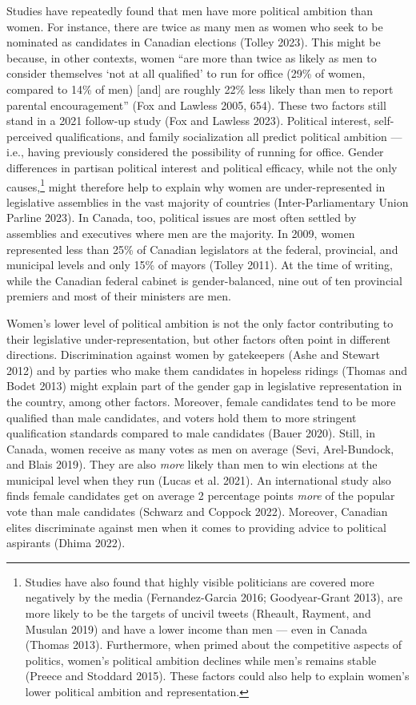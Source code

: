 \documentclass[
  letterpaper,
  DIV=11,
  numbers=noendperiod]{scrreprt}
\begin{document}
Studies have repeatedly found that men have more political ambition than
women. For instance, there are twice as many men as women who seek to be
nominated as candidates in Canadian elections (Tolley 2023). This might
be because, in other contexts, women ``are more than twice as likely as
men to consider themselves `not at all qualified' to run for office
(29\% of women, compared to 14\% of men) {[}and{]} are roughly 22\% less
likely than men to report parental encouragement'' (Fox and Lawless
2005, 654). These two factors still stand in a 2021 follow-up study (Fox
and Lawless 2023). Political interest, self-perceived qualifications,
and family socialization all predict political ambition --- i.e., having
previously considered the possibility of running for office. Gender
differences in partisan political interest and political efficacy, while
not the only causes,\footnote{Studies have also found that highly
  visible politicians are covered more negatively by the media
  (Fernandez-Garcia 2016; Goodyear-Grant 2013), are more likely to be
  the targets of uncivil tweets (Rheault, Rayment, and Musulan 2019) and
  have a lower income than men --- even in Canada (Thomas 2013).
  Furthermore, when primed about the competitive aspects of politics,
  women's political ambition declines while men's remains stable (Preece
  and Stoddard 2015). These factors could also help to explain women's
  lower political ambition and representation.} might therefore help to
explain why women are under-represented in legislative assemblies in the
vast majority of countries (Inter-Parliamentary Union Parline 2023). In
Canada, too, political issues are most often settled by assemblies and
executives where men are the majority. In 2009, women represented less
than 25\% of Canadian legislators at the federal, provincial, and
municipal levels and only 15\% of mayors (Tolley 2011). At the time of
writing, while the Canadian federal cabinet is gender-balanced, nine out
of ten provincial premiers and most of their ministers are men.

Women's lower level of political ambition is not the only factor
contributing to their legislative under-representation, but other
factors often point in different directions. Discrimination against
women by gatekeepers (Ashe and Stewart 2012) and by parties who make
them candidates in hopeless ridings (Thomas and Bodet 2013) might
explain part of the gender gap in legislative representation in the
country, among other factors. Moreover, female candidates tend to be
more qualified than male candidates, and voters hold them to more
stringent qualification standards compared to male candidates (Bauer
2020). Still, in Canada, women receive as many votes as men on average
(Sevi, Arel-Bundock, and Blais 2019). They are also \emph{more} likely
than men to win elections at the municipal level when they run (Lucas et
al. 2021). An international study also finds female candidates get on
average 2 percentage points \emph{more} of the popular vote than male
candidates (Schwarz and Coppock 2022). Moreover, Canadian elites
discriminate against men when it comes to providing advice to political
aspirants (Dhima 2022).
\end{document}
